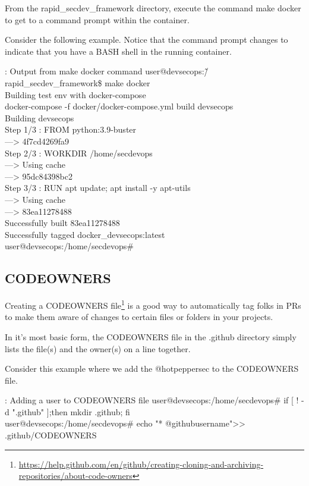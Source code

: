 From the rapid\_secdev\_framework directory, execute the command
make docker to get to a command prompt within the container.

Consider the following example. Notice that the command prompt changes
to indicate that you have a BASH shell in the running container.

\begin{mybox}{\thetcbcounter: Output from make docker command}
  user@devsecops:\~/rapid\_secdev\_framework\$ make docker\\
  Building test env with docker-compose\\
  docker-compose -f docker/docker-compose.yml build devsecops\\
  Building devsecops\\
  Step 1/3 : FROM python:3.9-buster\\
  ---> 4f7cd4269fa9\\
  Step 2/3 : WORKDIR /home/secdevops\\
  ---> Using cache\\
  ---> 95dc84398bc2\\
  Step 3/3 : RUN apt update; apt install -y apt-utils\\
  ---> Using cache\\
  ---> 83ea11278488\\
  Successfully built 83ea11278488\\
  Successfully tagged docker\_devsecops:latest\\
  user@devsecops:/home/secdevops\#
\end{mybox}


\subsection{CODEOWNERS}

\justify
Creating a CODEOWNERS file\footnote{\url{https://help.github.com/en/github/creating-cloning-and-archiving-repositories/about-code-owners}}
is a good way to automatically tag folks in PRs to make them aware of
changes to certain files or folders in your projects.

\justify
In it's most basic form, the CODEOWNERS file in the .github directory
simply lists the file(s) and the owner(s) on a line together.

\justify
Consider this example where we add the @hotpeppersec to the CODEOWNERS
file.

\begin{mybox}{\thetcbcounter: Adding a user to CODEOWNERS file}
  user@devsecops:/home/secdevops\# if [ ! -d ".github" ];then mkdir .github; fi\\
  user@devsecops:/home/secdevops\# echo "* @githubusername">> .github/CODEOWNERS
\end{mybox}

